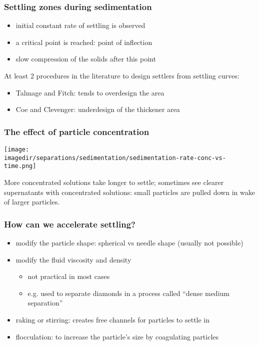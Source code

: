 \begin{frame}\frametitle{Settling zones during sedimentation}
	\begin{itemize}
		\item	initial constant rate of settling is observed
		\item	a critical point is reached: point of inflection
		\item	slow compression of the solids after this point
	\end{itemize}
	\vspace{12pt}
	At least 2 procedures in the literature to design settlers from settling curves:
	\begin{itemize}
		\item	Talmage and Fitch: tends to overdesign the area
		\item	Coe and Clevenger: underdesign of the thickener area
	\end{itemize}

	\vspace{12pt}
	{\color{myGreen}{In practice: we will rely on outside consultants and civil engineers, most likely, to size and design the unit. Else see the references at end for more details.}}
\end{frame}

\begin{frame}\frametitle{The effect of particle concentration}
	\begin{center}
		\texttt{[image: \\imagedir/separations/sedimentation/sedimentation-rate-conc-vs-time.png]}
	\end{center}

	More concentrated solutions take longer to settle; sometimes see clearer supernatants with concentrated solutions: small particles are pulled down in wake of larger particles.
\end{frame}

\begin{frame}\frametitle{How can we accelerate settling?}
	\begin{itemize}
		\item	modify the particle shape: spherical vs needle shape (usually not possible)
		\item	modify the fluid viscosity and density
		\begin{itemize}
			\item	not practical in most cases
			\item	e.g. used to separate diamonds in a process called ``dense medium separation''
		\end{itemize}
		\item	raking or stirring: creates free channels for particles to settle in
		\item	flocculation: to increase the particle's size by coagulating particles
	\end{itemize}
\end{frame}

